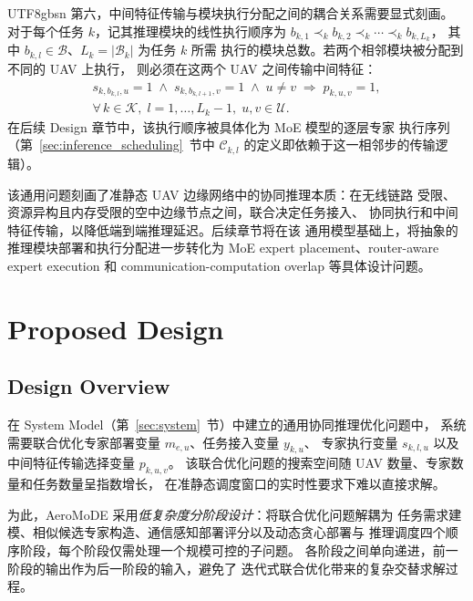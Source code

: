 \documentclass[conference]{IEEEtran}
\begin{document}
\begin{CJK*}{UTF8}{gbsn}
第六，中间特征传输与模块执行分配之间的耦合关系需要显式刻画。
对于每个任务 $k$，记其推理模块的线性执行顺序为
$b_{k,1} \prec_k b_{k,2} \prec_k \cdots \prec_k b_{k,L_k}$，
其中 $b_{k,l}\in\mathcal{B}$、$L_k=|\mathcal{B}_k|$ 为任务 $k$ 所需
执行的模块总数。若两个相邻模块被分配到不同的 UAV 上执行，
则必须在这两个 UAV 之间传输中间特征：
\begin{multline}
s_{k,b_{k,l},u}=1 \;\land\; s_{k,b_{k,l+1},v}=1
\;\land\; u\neq v \;\Longrightarrow\; p_{k,u,v}=1,\\[2pt]
\forall\,k\in\mathcal{K},\; l=1,\ldots,L_k-1,\; u,v\in\mathcal{U}.
\label{eq:p_s_coupling}
\end{multline}
在后续 Design 章节中，该执行顺序被具体化为 MoE 模型的逐层专家
执行序列（第~\ref{sec:inference_scheduling}~节中 $\mathcal{C}_{k,l}$
的定义即依赖于这一相邻步的传输逻辑）。

该通用问题刻画了准静态 UAV 边缘网络中的协同推理本质：在无线链路
受限、资源异构且内存受限的空中边缘节点之间，联合决定任务接入、
协同执行和中间特征传输，以降低端到端推理延迟。后续章节将在该
通用模型基础上，将抽象的推理模块部署和执行分配进一步转化为
MoE expert placement、router-aware expert execution 和
communication-computation overlap 等具体设计问题。


\section{Proposed Design}
\label{sec:design}

\subsection{Design Overview}
\label{sec:design_overview}

在 System Model（第~\ref{sec:system}~节）中建立的通用协同推理优化问题中，
系统需要联合优化专家部署变量 $m_{e,u}$、任务接入变量 $y_{k,u}$、
专家执行变量 $s_{k,l,u}$ 以及中间特征传输选择变量 $p_{k,u,v}$。
该联合优化问题的搜索空间随 UAV 数量、专家数量和任务数量呈指数增长，
在准静态调度窗口的实时性要求下难以直接求解。

为此，AeroMoDE 采用\emph{低复杂度分阶段设计}：将联合优化问题解耦为
任务需求建模、相似候选专家构造、通信感知部署评分以及动态贪心部署与
推理调度四个顺序阶段，每个阶段仅需处理一个规模可控的子问题。
各阶段之间单向递进，前一阶段的输出作为后一阶段的输入，避免了
迭代式联合优化带来的复杂交替求解过程。


\end{CJK*}
\end{document}
